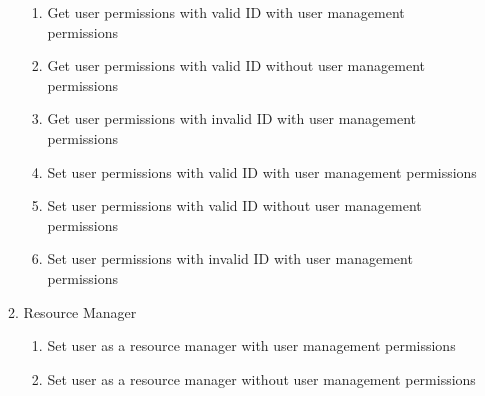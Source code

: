 \documentclass[12pt]{article}
\begin{document}
\begin{enumerate}
\begin{enumerate}
        \begin{enumerate}
            \item Get user permissions with valid ID with user management permissions
            \item Get user permissions with valid ID without user management permissions
            \item Get user permissions with invalid ID with user management permissions
            \item Set user permissions with valid ID with user management permissions
            \item Set user permissions with valid ID without user management permissions
            \item Set user permissions with invalid ID with user management permissions 
        \end{enumerate}
        \item Resource Manager
        \begin{enumerate}
            \item Set user as a resource manager with user management permissions
            \item Set user as a resource manager without user management permissions
        \end{enumerate}
    \end{enumerate}
\end{enumerate}

\clearpage
\end{document}
